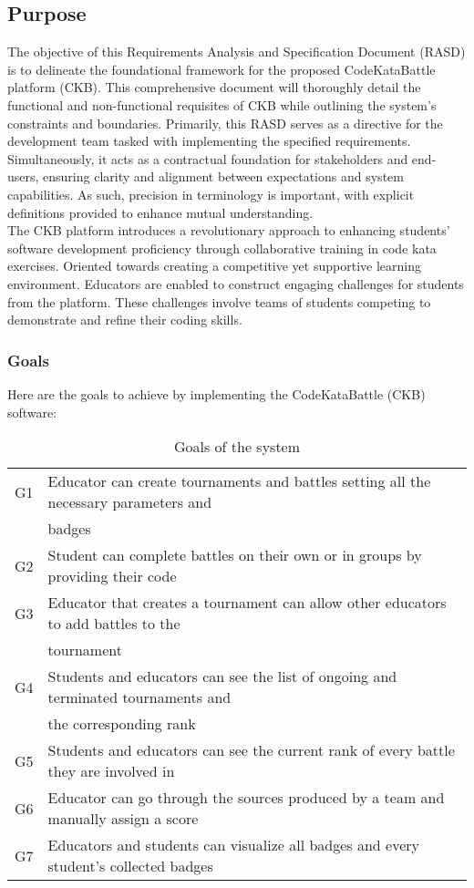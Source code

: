 \subsection{Purpose}
The objective of this Requirements Analysis and Specification Document (RASD) is to delineate the foundational framework for the proposed CodeKataBattle platform (CKB). This comprehensive document will thoroughly detail the functional and non-functional requisites of CKB while outlining the system's constraints and boundaries. Primarily, this RASD serves as a directive for the development team tasked with implementing the specified requirements. Simultaneously, it acts as a contractual foundation for stakeholders and end-users, ensuring clarity and alignment between expectations and system capabilities. As such, precision in terminology is important, with explicit definitions provided to enhance mutual understanding. \\
The CKB platform introduces a revolutionary approach to enhancing students' software development proficiency through collaborative training in code kata exercises. Oriented towards creating a competitive yet supportive learning environment. Educators are enabled to construct engaging challenges for students from the platform. These challenges involve teams of students competing to demonstrate and refine their coding skills.

\subsubsection{Goals}
Here are the goals to achieve by implementing the CodeKataBattle (CKB) software:
\begin{table}[h]
    \centering
    \begin{tabular}{|l|l|}
        \hline
        G1 & Educator can create tournaments and battles setting all the necessary parameters and\\& badges \\
        \hline
        G2 & Student can complete battles on their own or in groups by providing their code \\
        \hline
        G3 & Educator that creates a tournament can allow other educators to add battles to the\\&tournament\\
        \hline
        G4 & Students and educators can see the list of ongoing and terminated tournaments and\\&the corresponding rank \\
        \hline
        G5 & Students and educators can see the current rank of every battle they are involved in \\
        \hline
        G6 & Educator can go through the sources produced by a team and manually assign a score \\
        \hline
        G7 & Educators and students can visualize all badges and every student’s collected badges \\
        \hline
    \end{tabular}
    \caption{Goals of the system}
    \label{tab:goals}
\end{table}

